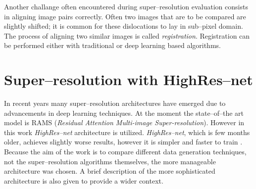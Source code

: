 Another challange often encountered during super--resolution evaluation consists in aligning image pairs correctly.
Often two images that are to be compared are slightly shifted; it is common for these dislocations to lay in sub--pixel domain.
The process of aligning two similar images is called \textit{registration}.
Registration can be performed either with traditional or deep learning based algorithms.

\section{Super--resolution with HighRes--net}
In recent years many super--resolution architectures have emerged due to advancements in deep learning techniques.
At the moment the state--of--the art model is RAMS (\textit{Residual Attention Multi-image Super-resolution}).
However in this work \textit{HighRes--net} architecture is utilized.
\textit{HighRes--net}, which is few months older, achieves slightly worse results, however it is simpler and faster to train \cite{paperswithcode-ranking}.
Because the aim of the work is to compare different data generation techniques, not the super--resolution algorithms themselves, the more manageable architecture was chosen.
A brief description of the more sophisticated architecture is also given to provide a wider context.

